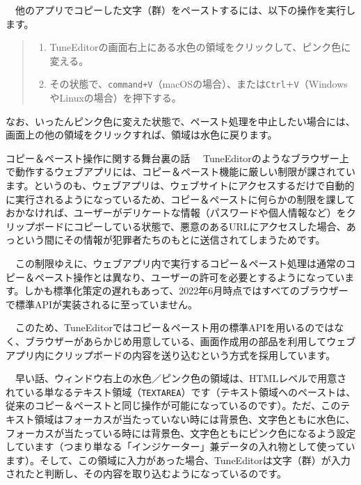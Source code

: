 　他のアプリでコピーした文字（群）をペーストするには、以下の操作を実行します。\label{copyPaste}

\begin{quote}
\begin{enumerate}
\item TuneEditorの画面右上にある水色の領域をクリックして、ピンク色に変える。
\item その状態で、\texttt{command+V}（macOSの場合）、または\texttt{Ctrl＋V}（WindowsやLinuxの場合）を押下する。
\end{enumerate}
\end{quote}

なお、いったんピンク色に変えた状態で、ペースト処理を中止したい場合には、画面上の他の領域をクリックすれば、領域は水色に戻ります。

\begin{itembox}[l]
{\textsf{コピー＆ペースト操作に関する舞台裏の話}}
　TuneEditorのようなブラウザー上で動作するウェブアプリには、コピー＆ペースト機能に厳しい制限が課されています。というのも、ウェブアプリは、ウェブサイトにアクセスするだけで自動的に実行されるようになっているため、コピー＆ペーストに何らかの制限を課しておかなければ、ユーザーがデリケートな情報（パスワードや個人情報など）をクリップボードにコピーしている状態で、悪意のあるURLにアクセスした場合、あっという間にその情報が犯罪者たちのもとに送信されてしまうためです。

\bigskip
　この制限ゆえに、ウェブアプリ内で実行するコピー＆ペースト処理は通常のコピー＆ペースト操作とは異なり、ユーザーの許可を必要とするようになっています。しかも標準化策定の遅れもあって、2022年6月時点ではすべてのブラウザーで標準APIが実装されるに至っていません。

\bigskip
　このため、TuneEditorではコピー＆ペースト用の標準APIを用いるのではなく、ブラウザーがあらかじめ用意している、画面作成用の部品を利用してウェブアプリ内にクリップボードの内容を送り込むという方式を採用しています。

\bigskip
　早い話、ウィンドウ右上の水色／ピンク色の領域は、HTMLレベルで用意されている単なるテキスト領域（\texttt{TEXTAREA}）です（テキスト領域へのペーストは、従来のコピー＆ペーストと同じ操作が可能になっているのです）。ただ、このテキスト領域はフォーカスが当たっていない時には背景色、文字色ともに水色に、フォーカスが当たっている時には背景色、文字色ともにピンク色になるよう設定しています（つまり単なる「インジケーター」兼データの入れ物として使っています）。そして、この領域に入力があった場合、TuneEditorは文字（群）が入力されたと判断し、その内容を取り込むようになっているのです。

\end{itembox}


